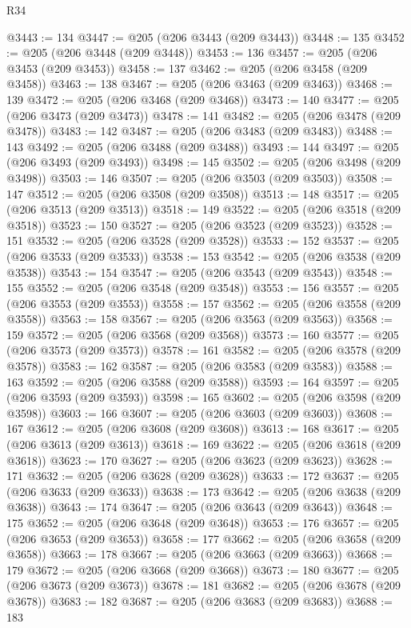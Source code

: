 \begin{lexlean}{R34}
\begin{coremodule}
@3443 := 134
@3447 := @205 (@206 @3443 (@209 @3443))
@3448 := 135
@3452 := @205 (@206 @3448 (@209 @3448))
@3453 := 136
@3457 := @205 (@206 @3453 (@209 @3453))
@3458 := 137
@3462 := @205 (@206 @3458 (@209 @3458))
@3463 := 138
@3467 := @205 (@206 @3463 (@209 @3463))
@3468 := 139
@3472 := @205 (@206 @3468 (@209 @3468))
@3473 := 140
@3477 := @205 (@206 @3473 (@209 @3473))
@3478 := 141
@3482 := @205 (@206 @3478 (@209 @3478))
@3483 := 142
@3487 := @205 (@206 @3483 (@209 @3483))
@3488 := 143
@3492 := @205 (@206 @3488 (@209 @3488))
@3493 := 144
@3497 := @205 (@206 @3493 (@209 @3493))
@3498 := 145
@3502 := @205 (@206 @3498 (@209 @3498))
@3503 := 146
@3507 := @205 (@206 @3503 (@209 @3503))
@3508 := 147
@3512 := @205 (@206 @3508 (@209 @3508))
@3513 := 148
@3517 := @205 (@206 @3513 (@209 @3513))
@3518 := 149
@3522 := @205 (@206 @3518 (@209 @3518))
@3523 := 150
@3527 := @205 (@206 @3523 (@209 @3523))
@3528 := 151
@3532 := @205 (@206 @3528 (@209 @3528))
@3533 := 152
@3537 := @205 (@206 @3533 (@209 @3533))
@3538 := 153
@3542 := @205 (@206 @3538 (@209 @3538))
@3543 := 154
@3547 := @205 (@206 @3543 (@209 @3543))
@3548 := 155
@3552 := @205 (@206 @3548 (@209 @3548))
@3553 := 156
@3557 := @205 (@206 @3553 (@209 @3553))
@3558 := 157
@3562 := @205 (@206 @3558 (@209 @3558))
@3563 := 158
@3567 := @205 (@206 @3563 (@209 @3563))
@3568 := 159
@3572 := @205 (@206 @3568 (@209 @3568))
@3573 := 160
@3577 := @205 (@206 @3573 (@209 @3573))
@3578 := 161
@3582 := @205 (@206 @3578 (@209 @3578))
@3583 := 162
@3587 := @205 (@206 @3583 (@209 @3583))
@3588 := 163
@3592 := @205 (@206 @3588 (@209 @3588))
@3593 := 164
@3597 := @205 (@206 @3593 (@209 @3593))
@3598 := 165
@3602 := @205 (@206 @3598 (@209 @3598))
@3603 := 166
@3607 := @205 (@206 @3603 (@209 @3603))
@3608 := 167
@3612 := @205 (@206 @3608 (@209 @3608))
@3613 := 168
@3617 := @205 (@206 @3613 (@209 @3613))
@3618 := 169
@3622 := @205 (@206 @3618 (@209 @3618))
@3623 := 170
@3627 := @205 (@206 @3623 (@209 @3623))
@3628 := 171
@3632 := @205 (@206 @3628 (@209 @3628))
@3633 := 172
@3637 := @205 (@206 @3633 (@209 @3633))
@3638 := 173
@3642 := @205 (@206 @3638 (@209 @3638))
@3643 := 174
@3647 := @205 (@206 @3643 (@209 @3643))
@3648 := 175
@3652 := @205 (@206 @3648 (@209 @3648))
@3653 := 176
@3657 := @205 (@206 @3653 (@209 @3653))
@3658 := 177
@3662 := @205 (@206 @3658 (@209 @3658))
@3663 := 178
@3667 := @205 (@206 @3663 (@209 @3663))
@3668 := 179
@3672 := @205 (@206 @3668 (@209 @3668))
@3673 := 180
@3677 := @205 (@206 @3673 (@209 @3673))
@3678 := 181
@3682 := @205 (@206 @3678 (@209 @3678))
@3683 := 182
@3687 := @205 (@206 @3683 (@209 @3683))
@3688 := 183

\end{coremodule}
\end{lexlean}
